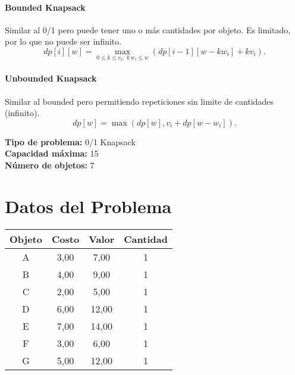 \documentclass{article}
\begin{document}
\paragraph{Bounded Knapsack} Similar al 0/1 pero puede tener uno o más cantidades por objeto. Es limitado, por lo que no puede ser infinito. 
\[
dp[i][w] = 
\max_{0 \leq k \leq c_i,\; k\,w_i \leq w} \left( dp[i-1][w - k w_i] + k v_i \right).
\]

\paragraph{Unbounded Knapsack} Similar al bounded pero permitiendo repeticiones sin limite de cantidades (infinito).
\[
dp[w] = \max ( dp[w], v_i + dp[w - w_i] ).
\]

\thispagestyle{empty}
\newpage
\textbf{Tipo de problema:} 0/1 Knapsack\\
\textbf{Capacidad máxima:} 15\\
\textbf{Número de objetos:} 7\\

\section*{Datos del Problema}
\begin{tabular}{|c|c|c|c|}
\hline
Objeto & Costo & Valor & Cantidad \\
\hline
A & 3,00 & 7,00 & 1 \\
B & 4,00 & 9,00 & 1 \\
C & 2,00 & 5,00 & 1 \\
D & 6,00 & 12,00 & 1 \\
E & 7,00 & 14,00 & 1 \\
F & 3,00 & 6,00 & 1 \\
G & 5,00 & 12,00 & 1 \\
\hline
\end{tabular}
\end{document}
